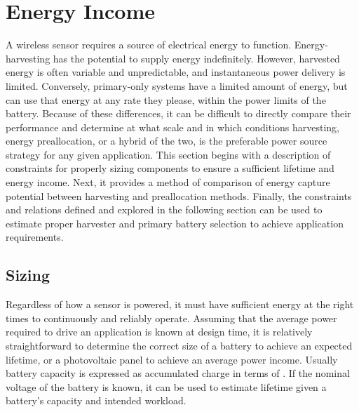 \section{Energy Income}
\label{sec:intuition:energy_income}
A wireless sensor requires a source of electrical energy to function. 
Energy-harvesting has the potential to supply energy indefinitely. However, harvested energy is often variable and unpredictable, and instantaneous power delivery is limited.
Conversely, primary-only systems have a limited amount of energy, but can use that energy at any rate they please, within the power limits of the battery.
Because of these differences, it can be difficult to directly compare their performance and determine at what scale and in which conditions harvesting, energy preallocation, or a hybrid of the two, is the preferable power source strategy for any given application.
This section begins with a description of constraints for properly sizing components to ensure a sufficient lifetime and energy income.
Next, it provides a method of comparison of energy capture potential between harvesting and preallocation methods.
Finally, the constraints and relations defined and explored in the following section can be used to estimate proper harvester and primary battery selection to achieve application requirements.

\subsection{Sizing}
\label{sec:intuition:energy_income_sizing}
Regardless of how a sensor is powered, it must have sufficient energy at the right times to continuously and reliably operate.
Assuming that the average power required to drive an application is known at design time, it is relatively straightforward to determine the correct size of a battery to achieve an expected lifetime, or a photovoltaic panel to achieve an average power income.
Usually battery capacity is expressed as accumulated charge in terms of \ssi{\milli\Ah}.
If the nominal voltage of the battery is known, it can be used to estimate lifetime given a battery's capacity and intended workload.

